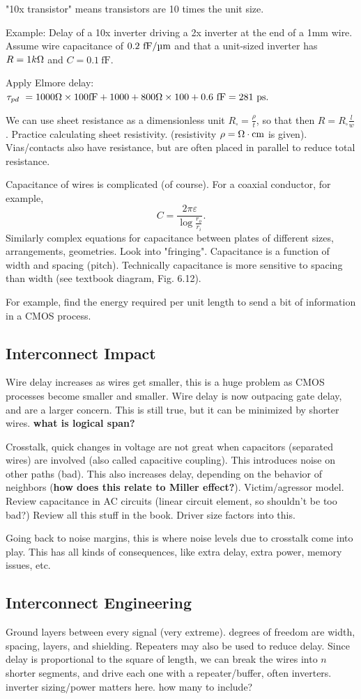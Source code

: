 \documentclass{article}
\begin{document}
"10x transistor" means transistors are 10 times the unit size.

Example: Delay of a 10x inverter driving a 2x inverter at the end of a 1mm wire. Assume wire capacitance of \(0.2 \ \mathrm{fF}/\micro\mathrm{m}\) and that a unit-sized inverter has \(R=1 k\ohm\) and \(C=0.1 \ \mathrm{fF}\). 

Apply Elmore delay: \(\tau_{pd}\ = 1000\ohm \times 100 \mathrm{fF} + 1000 + 800 \ohm \times 100 + 0.6 \ \mathrm{fF} = 281 \ \mathrm{ps}.\)

We can use sheet resistance as a dimensionless unit \(R_{\square}=\frac{\rho}{t}\), so that then \(R = R_\square \frac{l}{w}\). Practice calculating sheet resistivity. (resistivity \(\rho = \ohm \cdot \mathrm{cm}\) is given). Vias/contacts also have resistance, but are often placed in parallel to reduce total resistance.

Capacitance of wires is complicated (of course). For a coaxial conductor, for example, 
\[
	C = \frac{2\pi\varepsilon}{\log{\frac{r_o}{r_i}}}.
\]
Similarly complex equations for capacitance between plates of different sizes, arrangements, geometries. Look into "fringing". Capacitance is a function of width and spacing (pitch). Technically capacitance is more sensitive to spacing than width (see textbook diagram, Fig. 6.12).

For example, find the energy required per unit length to send a bit of information in a CMOS process.

\subsection{Interconnect Impact}

Wire delay increases as wires get smaller, this is a huge problem as CMOS processes become smaller and smaller. Wire delay is now outpacing gate delay, and are a larger concern. This is still true, but it can be minimized by shorter wires. \textbf{what is logical span?}

Crosstalk, quick changes in voltage are not great when capacitors (separated wires) are involved (also called capacitive coupling). This introduces noise on other paths (bad). This also increases delay, depending on the behavior of neighbors (\textbf{how does this relate to Miller effect?}). Victim/agressor model. Review capacitance in AC circuits (linear circuit element, so shouldn't be too bad?) Review all this stuff in the book. Driver size factors into this.

Going back to noise margins, this is where noise levels due to crosstalk come into play. This has all kinds of consequences, like extra delay, extra power, memory issues, etc.

\subsection{Interconnect Engineering}
Ground layers between every signal (very extreme). degrees of freedom are width, spacing, layers, and shielding. Repeaters may also be used to reduce delay. Since delay is proportional to the square of length, we can break the wires into \(n\) shorter segments, and drive each one with a repeater/buffer, often inverters. inverter sizing/power matters here. how many to include? 
\end{document}
